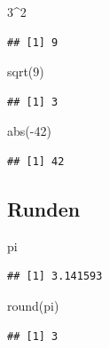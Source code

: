 \documentclass[
]{book}
\newenvironment{Shaded}{\begin{snugshade}}{\end{snugshade}}
\newcommand{\DecValTok}[1]{\textcolor[rgb]{0.00,0.00,0.81}{#1}}
\newcommand{\FunctionTok}[1]{\textcolor[rgb]{0.00,0.00,0.00}{#1}}
\newcommand{\NormalTok}[1]{#1}
\newcommand{\SpecialCharTok}[1]{\textcolor[rgb]{0.00,0.00,0.00}{#1}}
\begin{document}
\begin{Shaded}
\begin{Highlighting}[]
\DecValTok{3}\SpecialCharTok{\^{}}\DecValTok{2}
\end{Highlighting}
\end{Shaded}

\begin{verbatim}
## [1] 9
\end{verbatim}

\begin{Shaded}
\begin{Highlighting}[]
\FunctionTok{sqrt}\NormalTok{(}\DecValTok{9}\NormalTok{)}
\end{Highlighting}
\end{Shaded}

\begin{verbatim}
## [1] 3
\end{verbatim}

\begin{Shaded}
\begin{Highlighting}[]
\FunctionTok{abs}\NormalTok{(}\SpecialCharTok{{-}}\DecValTok{42}\NormalTok{)}
\end{Highlighting}
\end{Shaded}

\begin{verbatim}
## [1] 42
\end{verbatim}

\hypertarget{runden}{%
\subsection*{Runden}\label{runden}}

\begin{Shaded}
\begin{Highlighting}[]
\NormalTok{pi}
\end{Highlighting}
\end{Shaded}

\begin{verbatim}
## [1] 3.141593
\end{verbatim}

\begin{Shaded}
\begin{Highlighting}[]
\FunctionTok{round}\NormalTok{(pi)}
\end{Highlighting}
\end{Shaded}

\begin{verbatim}
## [1] 3
\end{verbatim}
\end{document}
